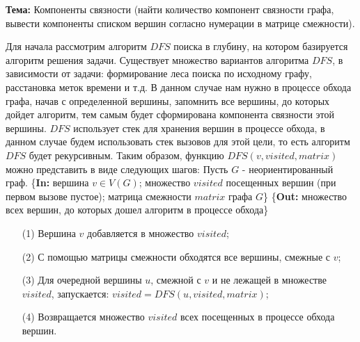 \documentclass[a4paper,20pt]{article}
\numberwithin{equation}{subsubsection}
\numberwithin{definition}{subsubsection}
\begin{document}
	\pagestyle{fancy}

	\noindent\textbf{Тема:} Компоненты связности (найти количество компонент связности графа, вывести компоненты списком вершин согласно нумерации в матрице смежности).
	\newline

	\noindent Для начала рассмотрим алгоритм $DFS$ поиска в глубину, на котором базируется алгоритм решения задачи. Существует множество вариантов алгоритма $DFS$, в зависимости от задачи: формирование леса поиска по исходному графу, расстановка меток времени и т.д. В данном случае нам нужно в процессе обхода графа, начав с определенной вершины, запомнить все вершины, до которых дойдет алгоритм, тем самым будет сформирована компонента связности этой вершины.
	$DFS$ использует стек для хранения вершин в процессе обхода, в данном случае будем использовать стек вызовов для этой цели, то есть алгоритм $DFS$ будет рекурсивным. Таким образом, функцию $DFS(v, visited, matrix)$ можно представить в виде следующих шагов:
	\newline
	\newline
	Пусть $G$ - неориентированный граф.
	\newline
	\{\textbf{In:} вершина $v \in V(G)$; множество $visited$ посещенных вершин (при первом вызове пустое); матрица смежности $matrix$ графа $G$\}
	\newline
	\{\textbf{Out:} множество всех вершин, до которых дошел алгоритм в процессе обхода\}

	\begin{enumerate}
		\item[(1)] Вершина $v$ добавляется в множество $visited$;
		\item[(2)] С помощью матрицы смежности обходятся все вершины, смежные с $v$;
		\item[(3)] Для очередной вершины $u$, смежной с $v$ и не лежащей в множестве $visited$, запускается: $visited = DFS(u, visited, matrix)$;
		\item[(4)] Возвращается множество $visited$ всех посещенных в процессе обхода вершин.
	\end{enumerate}
\end{document}
